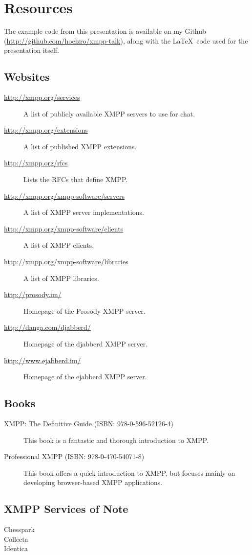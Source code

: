 \appendix
\section{Resources}

The example code from this presentation is available on my Github (\url{http://github.com/hoelzro/xmpp-talk}), along
with the \LaTeX\ code used for the presentation itself.

\subsection*{Websites}

\begin{description}
\item[\url{http://xmpp.org/services}] A list of publicly available XMPP servers to use for chat.
\item[\url{http://xmpp.org/extensions}] A list of published XMPP extensions.
\item[\url{http://xmpp.org/rfcs}] Lists the RFCs that define XMPP.
\item[\url{http://xmpp.org/xmpp-software/servers}] A list of XMPP server implementations.
\item[\url{http://xmpp.org/xmpp-software/clients}] A list of XMPP clients.
\item[\url{http://xmpp.org/xmpp-software/libraries}] A list of XMPP libraries.
\item[\url{http://prosody.im/}] Homepage of the Prosody XMPP server.
\item[\url{http://danga.com/djabberd/}] Homepage of the djabberd XMPP server.
\item[\url{http://www.ejabberd.im/}] Homepage of the ejabberd XMPP server.
\end{description}

\subsection*{Books}

\begin{description}
\item[XMPP: The Definitive Guide (ISBN: 978-0-596-52126-4)] This book is a fantastic and thorough introduction to XMPP.
\item[Professional XMPP (ISBN: 978-0-470-54071-8)] This book offers a quick introduction to XMPP, but focuses mainly on developing browser-based XMPP applications.
\end{description}

\subsection*{XMPP Services of Note}

\begin{description}
\item[Chesspark]
\item[Collecta]
\item[Identica]
\end{description}
